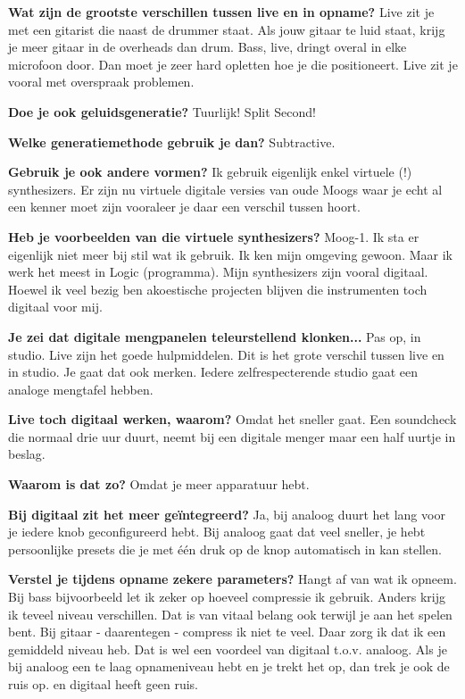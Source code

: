 \textbf{Wat zijn de grootste verschillen tussen live en in opname?}\newline
Live zit je met een gitarist die naast de drummer staat. Als jouw gitaar te luid staat, krijg je meer gitaar in de overheads dan drum. Bass, live, dringt overal in elke microfoon door.
Dan moet je zeer hard opletten hoe je die positioneert.
Live zit je vooral met overspraak problemen.

\textbf{Doe je ook geluidsgeneratie?}\newline
Tuurlijk! Split Second!

\textbf{Welke generatiemethode gebruik je dan?}\newline
Subtractive.

\textbf{Gebruik je ook andere vormen?}\newline
Ik gebruik eigenlijk enkel virtuele (!) synthesizers. Er zijn nu virtuele digitale versies van oude Moogs waar je echt al een kenner moet zijn vooraleer je daar een verschil tussen hoort.

\textbf{Heb je voorbeelden van die virtuele synthesizers?}\newline
Moog-1. Ik sta er eigenlijk niet meer bij stil wat ik gebruik. Ik ken mijn omgeving gewoon. Maar ik werk het meest in Logic (programma).
Mijn synthesizers zijn vooral digitaal. Hoewel ik veel bezig ben akoestische projecten blijven die instrumenten toch digitaal voor mij.

\textbf{Je zei dat digitale mengpanelen teleurstellend klonken...}\newline
Pas op, in studio. Live zijn het goede hulpmiddelen. Dit is het grote verschil tussen live en in studio. Je gaat dat ook merken.
Iedere zelfrespecterende studio gaat een analoge mengtafel hebben.

\textbf{Live toch digitaal werken, waarom?}\newline
Omdat het sneller gaat. Een soundcheck die normaal drie uur duurt, neemt bij een digitale menger maar een half uurtje in beslag.

\textbf{Waarom is dat zo?}\newline
Omdat je meer apparatuur hebt.

\textbf{Bij digitaal zit het meer geïntegreerd?}\newline
Ja, bij analoog duurt het lang voor je iedere knob geconfigureerd hebt. Bij analoog gaat dat veel sneller, je hebt persoonlijke presets die je met één druk op de knop automatisch in kan stellen.

\textbf{Verstel je tijdens opname zekere parameters?}\newline
Hangt af van wat ik opneem. Bij bass bijvoorbeeld let ik zeker op hoeveel compressie ik gebruik. Anders krijg ik teveel niveau verschillen. Dat is van vitaal belang ook terwijl je aan het spelen bent.
Bij gitaar - daarentegen - compress ik niet te veel. Daar zorg ik dat ik een gemiddeld niveau heb.
Dat is wel een voordeel van digitaal t.o.v. analoog. Als je bij analoog een te laag opnameniveau hebt en je trekt het op, dan trek je ook de ruis op. en digitaal heeft geen ruis.

